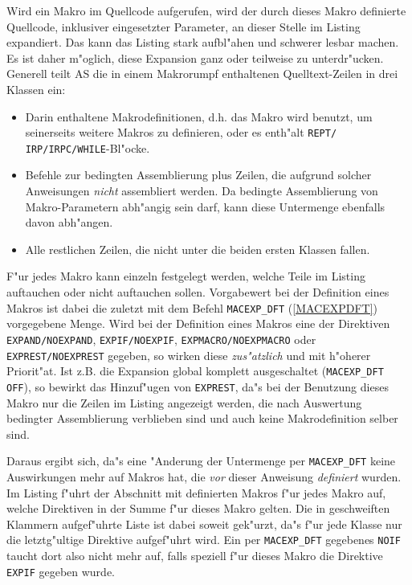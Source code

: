 \documentclass[12pt,a4paper,twoside]{report}
\newcommand{\tty}[1]{{\tt #1}}
\begin{document}
Wird ein Makro im Quellcode aufgerufen, wird der durch dieses Makro definierte
Quellcode, inklusiver eingesetzter Parameter, an dieser Stelle im Listing
expandiert.  Das kann das Listing stark aufbl"ahen und schwerer lesbar
machen.  Es ist daher m"oglich, diese Expansion ganz oder teilweise zu
unterdr"ucken.  Generell teilt AS die in einem Makrorumpf enthaltenen
Quelltext-Zeilen in drei Klassen ein:
\begin{itemize}
\item{Darin enthaltene Makrodefinitionen, d.h. das Makro wird benutzt, um
      seinerseits weitere Makros zu definieren, oder es enth"alt \tty{REPT/
      IRP/IRPC/WHILE}-Bl"ocke.}
\item{Befehle zur bedingten Assemblierung plus Zeilen, die aufgrund
      solcher Anweisungen {\it nicht} assembliert werden.  Da bedingte
      Assemblierung von Makro-Parametern abh"angig sein darf, kann diese
      Untermenge ebenfalls davon abh"angen.}
\item{Alle restlichen Zeilen, die nicht unter die beiden ersten Klassen
      fallen.}
\end{itemize}
F"ur jedes Makro kann einzeln festgelegt werden, welche Teile im Listing
auftauchen oder nicht auftauchen sollen.  Vorgabewert bei der Definition
eines Makros ist dabei die zuletzt mit dem Befehl \tty{MACEXP\_DFT}
(\ref{MACEXPDFT}) vorgegebene Menge.  Wird bei der Definition eines
Makros eine der Direktiven \tty{EXPAND/NOEXPAND}, \tty{EXPIF/NOEXPIF},
\tty{EXPMACRO/NOEXPMACRO} oder \tty{EXPREST/NOEXPREST} gegeben, so wirken
diese {\it zus"atzlich} und mit h"oherer Priorit"at.  Ist z.B. die Expansion
global komplett ausgeschaltet (\tty{MACEXP\_DFT OFF}), so bewirkt das
Hinzuf"ugen von \tty{EXPREST}, da"s bei der Benutzung dieses Makro nur
die Zeilen im Listing angezeigt werden, die nach Auswertung bedingter
Assemblierung verblieben sind und auch keine Makrodefinition selber sind.

Daraus ergibt sich, da"s eine "Anderung der Untermenge per \tty{MACEXP\_DFT}
keine Auswirkungen mehr auf Makros hat, die {\it vor} dieser Anweisung
{\it definiert} wurden.  Im Listing f"uhrt der Abschnitt mit definierten Makros
f"ur jedes Makro auf, welche Direktiven in der Summe f"ur dieses Makro
gelten.  Die in geschweiften Klammern aufgef"uhrte Liste ist dabei soweit
gek"urzt, da"s f"ur jede Klasse nur die letztg"ultige Direktive aufgef"uhrt
wird.  Ein per \tty{MACEXP\_DFT} gegebenes \tty{NOIF} taucht dort also
nicht mehr auf, falls speziell f"ur dieses Makro die Direktive \tty{EXPIF}
gegeben wurde.
\end{document}
